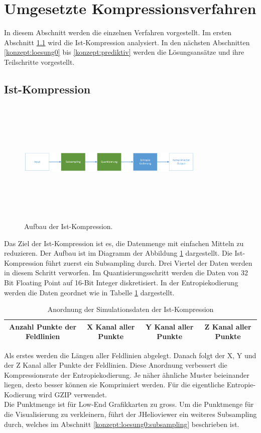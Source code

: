 \section{Umgesetzte Kompressionsverfahren} \label{konzept}
In diesem Abschnitt werden die einzelnen Verfahren vorgestellt. Im ersten Abschnitt \ref{konzept:ist-komprimierung} wird die Ist-Kompression analysiert. In den nächsten Abschnitten \ref{konzept:loesung0} bis \ref{konzept:prediktiv} werden die Lösungsansätze und ihre Teilschritte vorgestellt.

\subsection{Ist-Kompression} \label{konzept:ist-komprimierung}
\begin{figure}[!htbp]
	\center
	\includegraphics[width=0.8\textwidth,height=6cm,keepaspectratio]{./pictures/konzept/ist/aufbau.png}
	\caption{Aufbau der Ist-Kompression.}
	\label{konzept:ist:aufbau:diagramm}
\end{figure}
Das Ziel der Ist-Kompression ist es, die Datenmenge mit einfachen Mitteln zu reduzieren. Der Aufbau ist im Diagramm der Abbildung \ref{konzept:ist:aufbau:diagramm} dargestellt. Die Ist-Kompression führt zuerst ein Subsampling durch. Drei Viertel der Daten werden in diesem Schritt verworfen. Im Quantisierungsschritt werden die Daten von 32 Bit Floating Point auf 16-Bit Integer diskretisiert. In der Entropiekodierung werden die Daten geordnet wie in Tabelle \ref{konzept:ist:entropie} dargestellt.
\begin{table}[!htbp]
	\center
	\begin{tabular}{|c|c|c|c|}
	\hline
	Anzahl Punkte der Feldlinien & X Kanal aller Punkte & Y Kanal aller Punkte & Z Kanal aller Punkte \\\hline
	\end{tabular}
	\caption{Anordnung der Simulationsdaten der Ist-Kompression}
	\label{konzept:ist:entropie}
\end{table}
Als erstes werden die Längen aller Feldlinien abgelegt. Danach folgt der X, Y und der Z Kanal aller Punkte der Feldlinien. Diese Anordnung verbessert die Kompressionsrate der Entropiekodierung. Je näher ähnliche Muster beieinander liegen, desto besser können sie Komprimiert werden. Für die eigentliche Entropie-Kodierung wird GZIP verwendet.\\
Die Punktmenge ist für Low-End Grafikkarten zu gross. Um die Punktmenge für die Visualisierung zu verkleinern, führt der JHelioviewer ein weiteres Subsampling durch, welches im Abschnitt \ref{konzept:loesung0:subsampling} beschrieben ist.

